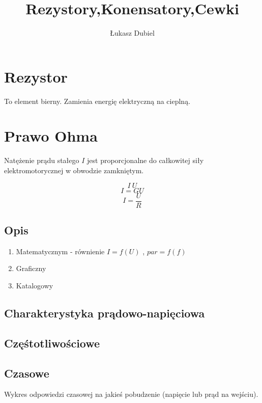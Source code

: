 \documentclass[11pt]{article}
\author{Łukasz Dubiel}
\title{Rezystory,Konensatory,Cewki}
\begin{document}
\maketitle

\section{Rezystor}

To element bierny. Zamienia energię elektryczną na cieplną.

\section{Prawo Ohma}
Natężenie prądu stałego $I$ jest proporcjonalne do całkowitej siły elektromotorycznej w obwodzie zamkniętym.

$$ I ~ U $$
$$ I = G U $$
$$ I = \frac{U}{R}$$

\subsection{Opis}
\begin{enumerate}
\item{Matematycznym - równienie $I = f(U)$ , $par = f(f)$}
\item{Graficzny}
\item{Katalogowy}
\end{enumerate}

\subsection{Charakterystyka prądowo-napięciowa}

\subsection{Częśtotliwościowe}

\subsection{Czasowe}
Wykres odpowiedzi czasowej na jakieś pobudzenie (napięcie lub prąd na wejściu). 
\end{document}
